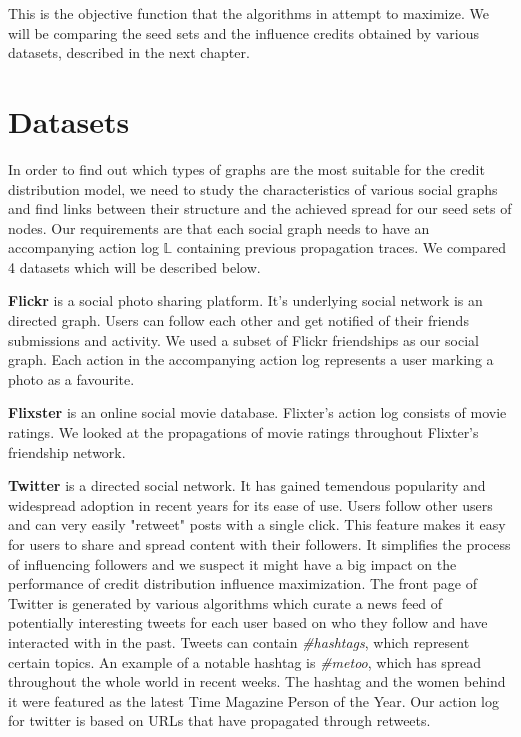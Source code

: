 \documentclass{acm_proc_article-sp}
\begin{document}
This is the objective function that the algorithms in \cite{goyal:datainfluence} attempt to maximize. We will be comparing the seed sets and the influence credits obtained by various datasets, described in the next chapter.

\section{Datasets}

In order to find out which types of graphs are the most suitable for the credit distribution model, we need to study the characteristics of various social graphs and find links between their structure and the achieved spread for our seed sets of nodes. Our requirements are that each social graph needs to have an accompanying action log $\mathbb{L}$ containing previous propagation traces. We compared 4 datasets which will be described below.

\textbf{Flickr} \cite{data:flickr} is a social photo sharing platform. It's underlying social network is an directed graph. Users can follow each other and get notified of their friends submissions and activity. We used a subset of Flickr friendships as our social graph. Each action in the accompanying action log represents a user marking a photo as a favourite. \cite{data:flickr-paper}

\textbf{Flixster} \cite{data:flixster} is an online social movie database. Flixter's action log consists of movie ratings. We looked at the propagations of movie ratings throughout Flixter's friendship network. \cite{data:flixsterpaper}

\textbf{Twitter} \cite{data:twitter} is a directed social network. It has gained temendous popularity and widespread adoption in recent years for its ease of use. Users follow other users and can very easily "retweet" posts with a single click. This feature makes it easy for users to share and spread content with their followers. It simplifies the process of influencing followers and we suspect it might have a big impact on the performance of credit distribution influence maximization. The front page of Twitter is generated by various algorithms which curate a news feed of potentially interesting tweets for each user based on who they follow and have interacted with in the past. Tweets can contain \textit{\#hashtags}, which represent certain topics. An example of a notable hashtag is \textit{\#metoo}, which has spread throughout the whole world in recent weeks. The hashtag and the women behind it were featured as the latest Time Magazine Person of the Year. Our action log for twitter is based on URLs that have propagated through retweets.
\end{document}

